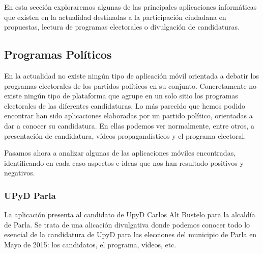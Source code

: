 En esta sección exploraremos algunas de las principales aplicaciones informáticas que existen en la actualidad destinadas a la participación ciudadana en propuestas, lectura de programas electorales o divulgación de candidaturas.

\subsection{Programas Políticos}

En la actualidad no existe ningún tipo de aplicación móvil orientada a debatir los programas electorales de los partidos políticos en su conjunto. Concretamente no existe ningún tipo de plataforma que agrupe en un solo sitio los programas electorales de las diferentes candidaturas.
Lo más parecido que hemos podido encontrar han sido aplicaciones elaboradas por un partido político, orientadas a dar a conocer su candidatura. En ellas podemos ver normalmente, entre otros, a presentación de candidatura, vídeos propagandísticos y el programa electoral. 

Pasamos ahora a analizar algunas de las aplicaciones móviles encontradas, identificando en cada caso aspectos e ideas que nos han resultado positivos y negativos.

\subsubsection{UPyD Parla}
La aplicación presenta al candidato de UpyD Carlos Alt Bustelo para la alcaldía de Parla. Se trata de una alicación divulgativa donde podemos conocer todo lo esencial de la candidatura de UpyD para las elecciones del municipio de Parla en Mayo de 2015: los candidatos, el programa, vídeos, etc.

